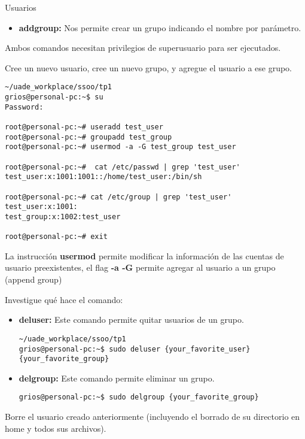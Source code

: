 \begin{section}{Usuarios}
\begin{itemize}
\item \textbf{addgroup:}
	Nos permite crear un grupo indicando el nombre por parámetro.
\end{itemize}

Ambos comandos necesitan privilegios de superusuario para ser ejecutados.


\begin{quoting}
Cree un nuevo usuario, cree un nuevo grupo, y agregue el usuario a ese grupo.
\end{quoting}


\begin{lstlisting}[style=Ubuntu]
~/uade_workplace/ssoo/tp1
grios@personal-pc:~$ su
Password: 

root@personal-pc:~# useradd test_user
root@personal-pc:~# groupadd test_group
root@personal-pc:~# usermod -a -G test_group test_user

root@personal-pc:~#  cat /etc/passwd | grep 'test_user'
test_user:x:1001:1001::/home/test_user:/bin/sh

root@personal-pc:~# cat /etc/group | grep 'test_user'
test_user:x:1001:
test_group:x:1002:test_user

root@personal-pc:~# exit
\end{lstlisting}

La instrucción \textbf{usermod} permite modificar la información de las cuentas de usuario preexistentes, el flag \textbf{-a -G} permite agregar al usuario a un grupo (append group)

\begin{quoting}
Investigue qué hace el comando:
\end{quoting}

\begin{itemize}
\item \textbf{deluser:}
Este comando permite quitar usuarios de un grupo.
\begin{lstlisting}[style=Ubuntu]
~/uade_workplace/ssoo/tp1
grios@personal-pc:~$ sudo deluser {your_favorite_user} {your_favorite_group} 
\end{lstlisting}

\item \textbf{delgroup:}
Este comando permite eliminar un grupo.
\begin{lstlisting}[style=Ubuntu]
grios@personal-pc:~$ sudo delgroup {your_favorite_group} 
\end{lstlisting}
\end{itemize}

\begin{quoting}
Borre el usuario creado anteriormente (incluyendo el borrado de su directorio en home y todos sus
archivos).
\end{quoting}


\end{section}

